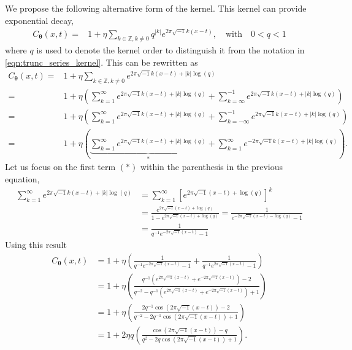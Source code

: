 \documentclass{iitthesis}          %
\newcommand{\bm}[1]{\boldsymbol{#1}}
\newcommand{\vtheta}{{\bm{\theta}}}
\def\abs#1{\ensuremath{\left \lvert #1 \right \rvert}}
\begin{document}
\label{sec:exp_decay_kernel}
We propose the following alternative form of the kernel. This kernel can provide exponential decay,
\begin{align*}
C_\vtheta(x, t) = & 1 + \eta \sum_{k \in \mathbb{Z}, k \neq 0 } q^{\abs{k}}  
e^{ 2 \pi\sqrt{-1} k (x-t)}, \quad \text{with} \quad 0 < q < 1
\end{align*}
where $q$ is used to denote the kernel order to distinguish it from the notation in \eqref{eqn:trunc_series_kernel}. This can be rewritten as
\begin{align*}
C_\vtheta(x, t) = & 1 + \eta \sum_{k \in \mathbb{Z}, k \neq 0 } 
e^{ 2 \pi\sqrt{-1} k (x-t) + \abs{k} \log(q)}
\\
=& 1 + \eta 
\left(
\sum_{k=1}^\infty e^{ 2 \pi\sqrt{-1} k (x-t) + \abs{k} \log(q)} 
+
\sum_{k=\infty}^{-1} e^{ 2 \pi\sqrt{-1} k (x-t) + \abs{k} \log(q)}
\right)
\\
=& 1 + \eta 
\left(
\sum_{k=1}^\infty e^{ 2 \pi\sqrt{-1} k (x-t) + \abs{k} \log(q)} 
+
\sum_{k=-\infty}^{-1} e^{ 2 \pi\sqrt{-1} k (x-t) + \abs{k} \log(q)}
\right)
\\
=& 1 + \eta 
\left(
\underbrace{
	\sum_{k=1}^\infty e^{ 2 \pi\sqrt{-1} k (x-t) + \abs{k} \log(q)} }_{*}
+
\sum_{k=1}^{\infty} e^{ -2 \pi\sqrt{-1} k (x-t) + \abs{k} \log(q)}
\right).
\end{align*}
Let us focus on the first term $(*)$ within the parenthesis in the previous equation,
\begin{align*}
\sum_{k=1}^\infty e^{ 2 \pi\sqrt{-1} k (x-t) + \abs{k} \log(q)} & =
\sum_{k=1}^\infty \left[e^{ 2 \pi\sqrt{-1} (x-t) +  \log(q)} \right]^k
\\
& = \frac{e^{ 2 \pi\sqrt{-1} (x-t) +  \log(q)}}{1- e^{ 2 \pi\sqrt{-1} (x-t) +  \log(q)}}
= \frac{1}{ e^{- 2 \pi\sqrt{-1} (x-t) -  \log(q)} -1 }
\\
& =\frac{1}{ q^{-1} e^{- 2 \pi\sqrt{-1} (x-t)} -1 }
\end{align*}
Using this result
\begin{align*}
C_\vtheta(x, t) &= 
1 + \eta 
\left(
\frac{1}{ q^{-1} e^{- 2 \pi\sqrt{-1} (x-t)} -1 }
+
\frac{1}{ q^{-1} e^{ 2 \pi\sqrt{-1} (x-t)} -1 }
\right)
\\
&= 
1 + \eta 
\left(
\frac{q^{-1} \left(e^{2 \pi\sqrt{-1} (x-t) }+ e^{ -2 \pi\sqrt{-1} (x-t)}\right) -2 }
{q^{-2} - q^{-1} \left(e^{ 2 \pi\sqrt{-1} (x-t)} + e^{ -2 \pi\sqrt{-1} (x-t)}\right) + 1 }
\right)
\\
&= 
1 + \eta 
\left(
\frac{2 q^{-1} \cos({2 \pi\sqrt{-1} (x-t) }) -2 }
{q^{-2} - 2 q^{-1} \cos({ 2 \pi\sqrt{-1} (x-t)})  + 1 }
\right)
\\
&= 
1 + 2 \eta q
\left(
\frac{ \cos({2 \pi\sqrt{-1} (x-t) }) - q }
{q^{2} - 2 q \cos({ 2 \pi\sqrt{-1} (x-t)})  + 1 }
\right).
\end{align*}
\end{document}
